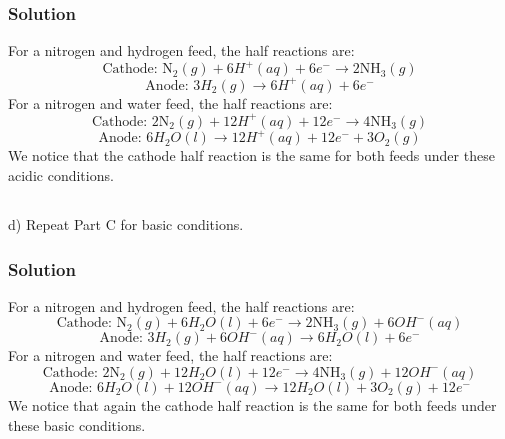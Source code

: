 \documentclass[12pt]{article}
\begin{document}
\subsubsection{Solution}
For a nitrogen and hydrogen feed, the half reactions are:
\begin{equation}
\text{Cathode: } \mathrm{N}_{2}(g) + 6 H^{+}(aq) + 6 e^{-} \rightarrow 2 \mathrm{NH}_{3}(g)
\end{equation}
\begin{equation}
\text{Anode: } 3 H_{2}(g) \rightarrow 6 H^{+}(aq) + 6 e^{-}
\end{equation}
For a nitrogen and water feed, the half reactions are:
\begin{equation}
\text{Cathode: } 2\mathrm{N}_{2}(g) + 12 H^{+}(aq) + 12 e^{-} \rightarrow 4 \mathrm{NH}_{3}(g)
\end{equation}
\begin{equation}
\text{Anode: } 6 H_{2}O(l) \rightarrow 12 H^{+}(aq) + 12 e^{-} + 3 O_{2}(g)
\end{equation}
We notice that the cathode half reaction is the same for both feeds under these acidic conditions.
\subsection{}
d) Repeat Part C for basic conditions.\\
\subsubsection{Solution}
For a nitrogen and hydrogen feed, the half reactions are:
\begin{equation}
\text{Cathode: } \mathrm{N}_{2}(g) + 6 H_{2}O(l) + 6 e^{-} \rightarrow 2 \mathrm{NH}_{3}(g) + 6 OH^{-}(aq)
\end{equation}
\begin{equation}
\text{Anode: } 3 H_{2}(g) + 6 OH^{-}(aq) \rightarrow 6 H_{2}O(l) + 6 e^{-}
\end{equation}
For a nitrogen and water feed, the half reactions are:
\begin{equation}
\text{Cathode: } 2\mathrm{N}_{2}(g) +
    12 H_{2}O(l) + 12 e^{-} \rightarrow 4 \mathrm{NH}_{3}(g) + 12 OH^{-}(aq)
\end{equation}
\begin{equation}
\text{Anode: } 6 H_{2}O(l) + 12 OH^{-}(aq) \rightarrow 12 H_{2}O(l) + 3 O_{2}(g) + 12 e^{-}
\end{equation}
We notice that again the cathode half reaction is the same for both feeds under these basic conditions.
\end{document}
